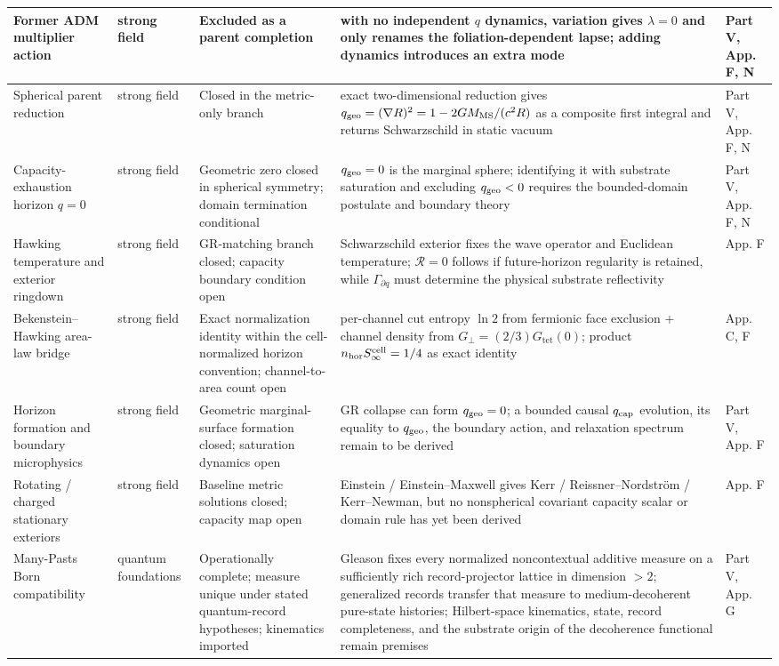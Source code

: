 \documentclass[11pt]{article}
\begin{document}
\begin{longtable}{|L{0.18\textwidth}|L{0.13\textwidth}|L{0.16\textwidth}|L{0.33\textwidth}|L{0.13\textwidth}|}
\hline
Former ADM multiplier action & strong field & Excluded as a parent completion & with no independent $q$ dynamics, variation gives $\lambda=0$ and only renames the foliation-dependent lapse; adding dynamics introduces an extra mode & Part V, App. F, N \\
\hline
Spherical parent reduction & strong field & Closed in the metric-only branch & exact two-dimensional reduction gives $q_{\rm geo}=(\nabla R)^2=1-2GM_{\rm MS}/(c^2R)$ as a composite first integral and returns Schwarzschild in static vacuum & Part V, App. F, N \\
\hline
Capacity-exhaustion horizon $q=0$ & strong field & Geometric zero closed in spherical symmetry; domain termination conditional & $q_{\rm geo}=0$ is the marginal sphere; identifying it with substrate saturation and excluding $q_{\rm geo}<0$ requires the bounded-domain postulate and boundary theory & Part V, App. F, N \\
\hline
Hawking temperature and exterior ringdown & strong field & GR-matching branch closed; capacity boundary condition open & Schwarzschild exterior fixes the wave operator and Euclidean temperature; $\mathcal R=0$ follows if future-horizon regularity is retained, while $\Gamma_{\partial q}$ must determine the physical substrate reflectivity & App. F \\
\hline
Bekenstein--Hawking area-law bridge & strong field & Exact normalization identity within the cell-normalized horizon convention; channel-to-area count open & per-channel cut entropy $\ln 2$ from fermionic face exclusion + channel density from $G_\perp=(2/3)G_{\mathrm{tet}}(0)$; product $n_{\rm hor}S_\infty^{\rm cell}=1/4$ as exact identity & App. C, F \\
\hline
Horizon formation and boundary microphysics & strong field & Geometric marginal-surface formation closed; saturation dynamics open & GR collapse can form $q_{\rm geo}=0$; a bounded causal $q_{\rm cap}$ evolution, its equality to $q_{\rm geo}$, the boundary action, and relaxation spectrum remain to be derived & Part V, App. F \\
\hline
Rotating / charged stationary exteriors & strong field & Baseline metric solutions closed; capacity map open & Einstein / Einstein--Maxwell gives Kerr / Reissner--Nordstr\"om / Kerr--Newman, but no nonspherical covariant capacity scalar or domain rule has yet been derived & App. F \\
\hline
Many-Pasts Born compatibility & quantum foundations & Operationally complete; measure unique under stated quantum-record hypotheses; kinematics imported & Gleason fixes every normalized noncontextual additive measure on a sufficiently rich record-projector lattice in dimension $>2$; generalized records transfer that measure to medium-decoherent pure-state histories; Hilbert-space kinematics, state, record completeness, and the substrate origin of the decoherence functional remain premises & Part V, App. G \\

\end{longtable}
\end{document}
